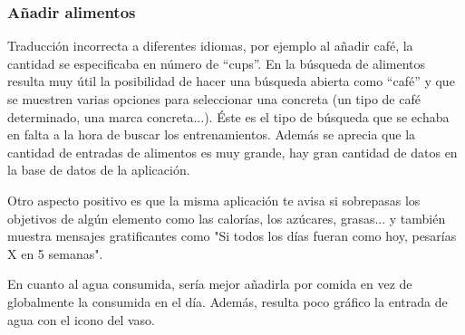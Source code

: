 \documentclass[a4paper]{article}
\begin{document}
			\subsubsection*{Añadir alimentos}
			
			Traducción incorrecta a diferentes idiomas, por ejemplo al añadir café, la cantidad se especificaba en número de ``cups''. En la búsqueda de alimentos resulta muy útil la posibilidad de hacer una búsqueda abierta como ``café'' y que se muestren varias opciones para seleccionar una concreta (un tipo de café determinado, una marca concreta...). Éste es el tipo de búsqueda que se echaba en falta a la hora de buscar los entrenamientos. Además se aprecia que la cantidad de entradas de alimentos es muy grande, hay gran cantidad de datos en la base de datos de la aplicación.
			
			Otro aspecto positivo es que la misma aplicación te avisa si sobrepasas los objetivos de algún elemento como las calorías, los azúcares, grasas... y también muestra mensajes gratificantes como "Si todos los días fueran como hoy, pesarías X en 5 semanas".
			
			En cuanto al agua consumida, sería mejor añadirla por comida en vez de globalmente la consumida en el día. Además, resulta poco gráfico la entrada de agua con el icono del vaso.
			
\end{document}
